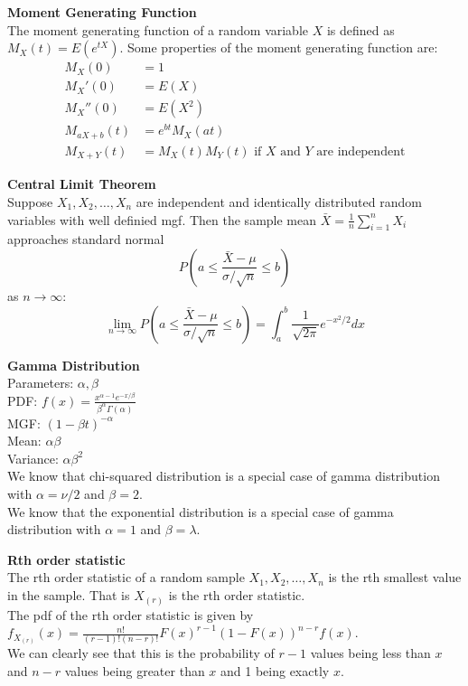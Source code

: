 \documentclass[answers,12pt,addpoints]{exam}
\begin{document}
\begin{definition}
    \textbf{Moment Generating Function}\\
    The moment generating function of a random variable $X$ is defined as $M_X(t) = E(e^{tX})$.
    Some properties of the moment generating function are:
    \begin{align*}
        M_X(0) &= 1\\
        M_X'(0) &= E(X)\\
        M_X''(0) &= E(X^2)\\
        M_{aX + b}(t) &= e^{bt}M_X(at)\\
        M_{X+Y}(t) &= M_X(t)M_Y(t) \text{ if $X$ and $Y$ are independent}
    \end{align*}

\end{definition}
\begin{definition}
    \textbf{Central Limit Theorem}\\
    Suppose $X_1, X_2, \ldots, X_n$ are independent and identically distributed random variables with well definied mgf. Then the sample mean $\bar{X} = \frac{1}{n}\sum_{i=1}^{n}X_i$ approaches standard normal 
    $$ P( a \leq \frac{\bar{X} - \mu}{\sigma/\sqrt{n}} \leq b)$$
    as $n \to \infty$:
    $$ \lim_{n \to \infty} P( a \leq \frac{\bar{X} - \mu}{\sigma/\sqrt{n}} \leq b) = \int_{a}^{b} \frac{1}{\sqrt{2\pi}}e^{-x^2/2}dx$$
\end{definition}
\begin{definition}
    \textbf{Gamma Distribution}\\
    Parameters: $\alpha, \beta$\\
    PDF: $f(x) = \frac{x^{\alpha - 1}e^{-x/ \beta}}{\beta^{\alpha} \Gamma(\alpha)}$\\
    MGF: $(1 - \beta t)^{-\alpha}$\\
    Mean: $\alpha\beta$\\
    Variance: $\alpha\beta^2$\\
    We know that chi-squared distribution is a special case of gamma distribution with $\alpha = \nu/2$ and $\beta = 2$.\\
    We know that the exponential distribution is a special case of gamma distribution with $\alpha = 1$ and $\beta = \lambda$.
\end{definition}
\begin{definition}
    \textbf{Rth order statistic}\\
    The rth order statistic of a random sample $X_1, X_2, \ldots, X_n$ is the rth smallest value in the sample. That is $X_{(r)}$ is the rth order statistic.\\
    The pdf of the rth order statistic is given by $f_{X_{(r)}}(x) = \frac{n!}{(r-1)!(n-r)!}F(x)^{r-1}(1-F(x))^{n-r}f(x)$.\\
    We can clearly see that this is the probability of $r-1$ values being less than $x$ and $n-r$ values being greater than $x$ and 1 being exactly $x$.
    
\end{definition}
\end{document}
